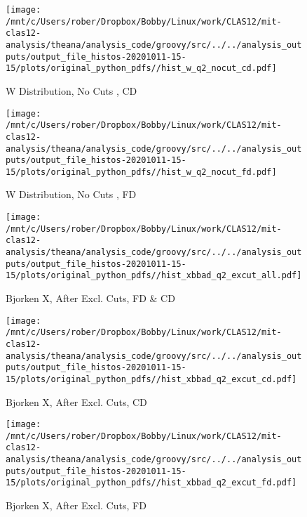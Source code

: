 \documentclass{article}
\begin{document}
\begin{landscape}
    \begin{figure}[h]
        \centering

        \texttt{[image: /mnt/c/Users/rober/Dropbox/Bobby/Linux/work/CLAS12/mit-clas12-analysis/theana/analysis\_code/groovy/src/../../analysis\_outputs/output\_file\_histos-20201011-15-15/plots/original\_python\_pdfs//hist\_w\_q2\_nocut\_cd.pdf]}
        \captionsetup{textformat=empty,labelformat=blank}
        \caption{W Distribution, No Cuts , CD}
    \end{figure}
    \clearpage
    
    \begin{figure}[h]
        \centering

        \texttt{[image: /mnt/c/Users/rober/Dropbox/Bobby/Linux/work/CLAS12/mit-clas12-analysis/theana/analysis\_code/groovy/src/../../analysis\_outputs/output\_file\_histos-20201011-15-15/plots/original\_python\_pdfs//hist\_w\_q2\_nocut\_fd.pdf]}
        \captionsetup{textformat=empty,labelformat=blank}
        \caption{W Distribution, No Cuts , FD}
    \end{figure}
    \clearpage
    
    \begin{figure}[h]
        \centering

        \texttt{[image: /mnt/c/Users/rober/Dropbox/Bobby/Linux/work/CLAS12/mit-clas12-analysis/theana/analysis\_code/groovy/src/../../analysis\_outputs/output\_file\_histos-20201011-15-15/plots/original\_python\_pdfs//hist\_xbbad\_q2\_excut\_all.pdf]}
        \captionsetup{textformat=empty,labelformat=blank}
        \caption{Bjorken X, After Excl. Cuts, FD \& CD}
    \end{figure}
    \clearpage
    
    \begin{figure}[h]
        \centering

        \texttt{[image: /mnt/c/Users/rober/Dropbox/Bobby/Linux/work/CLAS12/mit-clas12-analysis/theana/analysis\_code/groovy/src/../../analysis\_outputs/output\_file\_histos-20201011-15-15/plots/original\_python\_pdfs//hist\_xbbad\_q2\_excut\_cd.pdf]}
        \captionsetup{textformat=empty,labelformat=blank}
        \caption{Bjorken X, After Excl. Cuts, CD}
    \end{figure}
    \clearpage
    
    \begin{figure}[h]
        \centering

        \texttt{[image: /mnt/c/Users/rober/Dropbox/Bobby/Linux/work/CLAS12/mit-clas12-analysis/theana/analysis\_code/groovy/src/../../analysis\_outputs/output\_file\_histos-20201011-15-15/plots/original\_python\_pdfs//hist\_xbbad\_q2\_excut\_fd.pdf]}
        \captionsetup{textformat=empty,labelformat=blank}
        \caption{Bjorken X, After Excl. Cuts, FD}
    \end{figure}
    \clearpage
    

\end{landscape}
\end{document}
